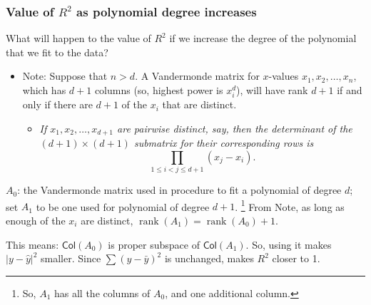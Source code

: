 \documentclass{beamer}
\theoremstyle{example}
\begin{document}
\begin{frame}
    \frametitle{Value of $R^2$ as polynomial degree increases}
    What will happen to the value of $R^2$ if we increase the degree of the polynomial that we fit to the data?

    \pause
    \begin{itemize}
        \item Note: Suppose that $n>d$. A Vandermonde matrix for $x$-values $x_1,x_2,\ldots, x_n$, which has $d+1$ columns (so, highest power is $x_i^d$), will have rank $d+1$ if and only if there are $d+1$ of the $x_i$ that are distinct.
        \pause
        \begin{itemize}
            \item[] \textit{If $x_1,x_2,\ldots,x_{d+1}$ are pairwise distinct, say, then the determinant of the $(d+1)\times(d+1)$ submatrix for their corresponding rows is}
            \[{\displaystyle\prod_{1\le i<j\le d+1}(x_j - x_i)}.\]
        \end{itemize}
    \end{itemize}

    \pause
    $A_0$: the Vandermonde matrix used in procedure to fit a polynomial of degree $d$; set $A_1$ to be one used for polynomial of degree $d+1$. \footnote{So, $A_{1}$ has all the columns of $A_0$, and one additional column.} From Note, as long as enough of the $x_i$ are distinct, $\operatorname{rank}(A_1) = \operatorname{rank}(A_0)+1$.

    \pause
    This means: $\textsf{Col}(A_0)$ is proper subspace of $\textsf{Col}(A_1)$. So, using it makes $|y - \hat{y}|^2$ smaller. Since $\sum(y - \bar{y})^2$ is unchanged, makes $R^2$ closer to 1.
\end{frame}
\end{document}
